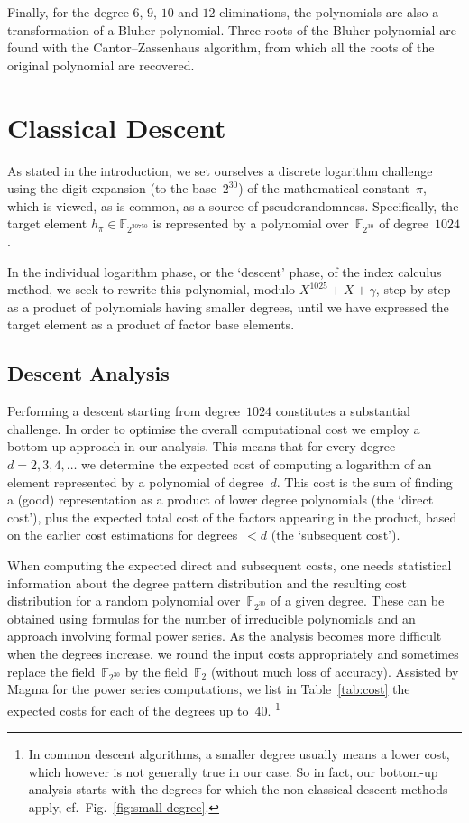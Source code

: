 \documentclass[11pt]{llncs}
\newcommand{\F}{\mathbb F}
\begin{document}
Finally, for the degree $6$, $9$, $10$ and $12$ eliminations, the
polynomials are also a transformation of a Bluher polynomial. Three
roots of the Bluher polynomial are found with the Cantor--Zassenhaus
algorithm, from which all the roots of the original polynomial are
recovered.


\section{Classical Descent}\label{sec:classical}

As stated in the introduction, we set ourselves a discrete logarithm
challenge using the digit expansion (to the base~$2^{30}$) of the
mathematical constant~$\pi$, which is viewed, as is common, as a
source of pseudorandomness.  Specifically, the target element
$h_{\pi} \in \F_{2^{30750}}$ is represented by a polynomial
over~$\F_{2^{30}}$ of degree~$\num{1024}$.

In the individual logarithm phase, or the `descent' phase, of the
index calculus method, we seek to rewrite this polynomial, modulo
$X^{1025} + X + \gamma$, step-by-step as a product of polynomials
having smaller degrees, until we have expressed the target element as
a product of factor base elements.

\subsection{Descent Analysis}

Performing a descent starting from degree~$\num{1024}$ constitutes a
substantial challenge.  In order to optimise the overall computational
cost we employ a bottom-up approach in our analysis.  This means that
for every degree $d = 2, 3, 4, \dots$ we determine the expected cost
of computing a logarithm of an element represented by a polynomial of
degree~$d$.  This cost is the sum of finding a (good) representation
as a product of lower degree polynomials (the `direct cost'), plus the
expected total cost of the factors appearing in the product, based on
the earlier cost estimations for degrees~$<d$ (the `subsequent cost').

When computing the expected direct and subsequent costs, one needs
statistical information about the degree pattern distribution and the
resulting cost distribution for a random polynomial over~$\F_{2^{30}}$
of a given degree.  These can be obtained using formulas for the
number of irreducible polynomials and an approach involving formal
power series.  As the analysis becomes more difficult when the degrees
increase, we round the input costs appropriately and sometimes replace
the field~$\F_{2^{30}}$ by the field~$\F_2$ (without much loss of
accuracy).  Assisted by Magma for the power series computations, we
list in Table~\ref{tab:cost} the expected costs for each of the
degrees up to~$40$.%
\footnote{In common descent algorithms, a smaller degree usually means
  a lower cost, which however is not generally true in our case.  So
  in fact, our bottom-up analysis starts with the degrees for which the
  non-classical descent methods apply, cf.~Fig.~\ref{fig:small-degree}.}
\end{document}
